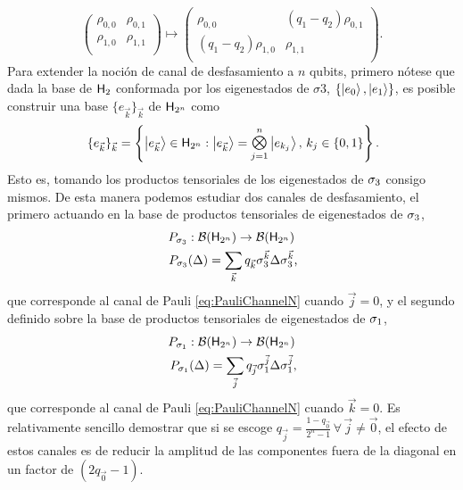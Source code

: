 \begin{equation}
    \begin{pmatrix}
        \rho_{0,0} & \rho_{0,1}\\
        \rho_{1,0} & \rho_{1,1}\\
    \end{pmatrix}\mapsto\begin{pmatrix}
        \rho_{0,0} & (q_{1}-q_{2})\rho_{0,1}\\
        (q_{1}-q_{2})\rho_{1,0} & \rho_{1,1}\\
    \end{pmatrix}.\nonumber
\end{equation}
Para extender la noción de canal de desfasamiento a $n$ qubits, primero nótese que dada la base de ${\sf H}_{2}$ conformada por los eigenestados de $\sigma{3}$, $\{\ket{e_{0}},\ket{e_{1}}\}$, es posible construir una base $\{e_{\vec{k}}\}_{\vec{k}}$ de ${\sf H}_{2^{n}}$ como
\begin{equation}
    \{e_{\vec{k}}\}_{\vec{k}}=\left\{\ket{e_{\vec{k}}}\in\hilbert_{2^{n}}: \ket{e_{\vec{k}}}=\Motimes_{j=1}^{n}\ket{e_{k_{j}}},\,k_{j}\in\{0,1\}\right\} \rlap{.}\nonumber
\end{equation}
Esto es, tomando los productos tensoriales de los eigenestados de $\sigma_{3}$ consigo mismos. De esta manera podemos estudiar dos canales de desfasamiento, el primero actuando en la base de productos tensoriales de eigenestados de $\sigma_{3}$,
\begin{gather}
    P_{\pauli{3}}:\mcB(\hilbert_{2^{n}}) \rightarrow \mcB(\hilbert_{2^{n}})\nonumber\\
    P_{\pauli{3}}(\Delta)=\sum_{\vec{k}}q_{\vec{k}}\pauli{3}^{\vec{k}}\Delta\pauli{3}^{\vec{k}}\rlap{,}\nonumber
\end{gather}
que corresponde al canal de Pauli \ref{eq:PauliChannelN} cuando $\vec{j}=0$, y el segundo definido sobre la base de productos tensoriales de eigenestados de $\sigma_{1}$,
\begin{gather}
    P_{\pauli{1}}:\mcB(\hilbert_{2^{n}}) \rightarrow \mcB(\hilbert_{2^{n}})\nonumber\\
    P_{\pauli{1}}(\Delta)=\sum_{\vec{j}}q_{\vec{j}}\pauli{1}^{\vec{j}}\Delta\pauli{1}^{\vec{j}}\rlap{,}\nonumber
\end{gather}
que corresponde al canal de Pauli \ref{eq:PauliChannelN} cuando $\vec{k}=0$. Es relativamente sencillo demostrar que si se escoge $q_{\vec{j}}=\frac{1-q_{\vec{0}}}{2^{n}-1}\,\forall\,\vec{j}\neq\vec{0}$, el efecto de estos canales es de reducir la amplitud de las componentes fuera de la diagonal en un factor de $(2q_{\vec{0}}-1)$. 

